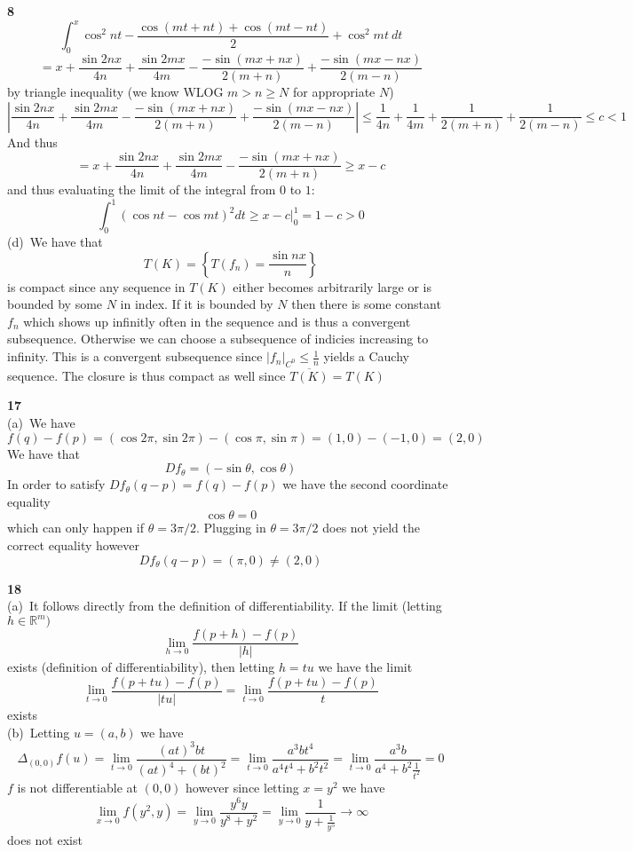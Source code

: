 \documentclass[12pt]{article}
\newenvironment{ques}[1]{\textbf{#1}\vspace{1 mm}\\ }{\bigskip}
\theoremstyle{definition}
\renewcommand{\l}{\left }
\renewcommand{\r}{\right }
\newcommand{\R}{\mathbb R}
\newcommand{\s}{\sin}
\renewcommand{\c}{\cos}
\renewcommand{\t}{\theta}
\begin{document}
\begin{ques}{8}
	$$\int_0^x \c^2 nt - \frac{\c (mt + nt) + \c (mt - nt)}{2} +  \c^2 mt\ dt$$
	$$= x + \frac{\s 2nx}{4n}+ \frac{\s 2mx}{4m} - \frac{-\s (mx + nx)}{2(m+n)}
	+ \frac{-\s (mx - nx)}{2(m-n)}$$
	by triangle inequality (we know WLOG $m > n \geq N$ for appropriate $N$)
	$$\l|\frac{\s 2nx}{4n}+ \frac{\s 2mx}{4m} - \frac{-\s (mx + nx)}{2(m+n)}
	+ \frac{-\s (mx - nx)}{2(m-n)}\r| \leq \frac 1 {4n} + \frac 1 {4m} + \frac
	1 {2(m+n)} + \frac 1 {2(m-n)} \leq c < 1$$
	And thus
	$$= x + \frac{\s 2nx}{4n}+ \frac{\s 2mx}{4m} - \frac{-\s (mx + nx)}{2(m+n)}
	\geq x - c$$
	and thus evaluating the limit of the integral from $0$ to $1$:
	$$\int_0^1 (\c nt - \c mt)^2 dt \geq x - c \bigg|_0^1 = 1 - c > 0$$
	(d)\ We have that
	$$T(K) = \l\{T(f_n) = \frac{\sin nx }{n}\r\}$$
	is compact since any sequence in $T(K)$ either becomes arbitrarily
	large or is bounded by some $N$ in index. If it is bounded by $N$ then
	there is some constant $f_n$ which shows up infinitly often in the sequence and is
	thus a convergent subsequence. Otherwise we can choose a subsequence of
	indicies increasing to infinity. This is a convergent subsequence since
	$|f_n|_{C^0} \leq \frac 1 n$ yields a Cauchy sequence. The closure is thus
	compact as well since $\overline{T(K)} = T(K)$
\end{ques}

\begin{ques}{17}
	(a)\ We have
	$$f(q) - f(p) = (\c 2\pi, \s 2\pi) - (\c \pi, \s \pi) = (1,0) - (-1,0) =
	(2,0)$$
	We have that
	$$Df_\t = (-\s \t, \c \t)$$
	In order to satisfy $Df_\t(q-p) = f(q) - f(p)$ we have the second coordinate equality
	$$\c \t = 0$$
	which can only happen if $\t = 3\pi/2$. Plugging in $\t = 3\pi/2$ does not
	yield the correct equality however
	$$Df_\t(q-p) = (\pi,0) \neq (2,0)$$
\end{ques}

\begin{ques}{18}
	(a)\ It follows directly from the definition of differentiability. If the limit
	(letting $h \in \R^m)$
	$$\lim_{h \to 0} \frac{f(p + h) - f(p)}{|h|}$$
	exists (definition of differentiability), then letting $h = tu$ we have the limit
	$$\lim_{t \to 0} \frac{f(p + tu) - f(p)}{|tu|} = \lim_{t \to 0} \frac{f(p +
	tu) - f(p)}{t} $$
	exists \\
	(b)\ Letting $u = (a,b)$ we have 
	$$\Delta_{(0,0)}f(u) = \lim_{t \to 0} \frac{(at)^3bt}{(at)^4 + (bt)^2} =
	\lim_{t \to 0} \frac{a^3bt^4}{a^4t^4 + b^2t^2} = \lim_{t \to 0}
	\frac{a^3b}{a^4 + b^2\frac{1}{t^2}} = 0$$
	$f$ is not differentiable at $(0,0)$ however since letting $x = y^2$ we have
	$$\lim_{x \to 0} f(y^2,y) = \lim_{y \to 0} \frac{y^6y}{y^8 + y^2} = \lim_{y
	\to 0}\frac{1}{y + \frac{1}{y^5}} \to \infty$$
	does not exist
\end{ques}
\end{document}
